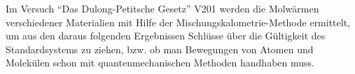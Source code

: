 Im Versuch \enquote{Das Dulong-Petitsche Gesetz} V201 werden die Molwärmen
verschiedener Materialien mit Hilfe der Mischungskalometrie-Methode ermittelt,
um aus den daraus folgenden Ergebnissen Schlüsse über die Gültigkeit des Standardsystems zu ziehen, 
bzw. ob man Bewegungen von Atomen und Molekülen schon mit quantenmechanischen Methoden handhaben muss.
